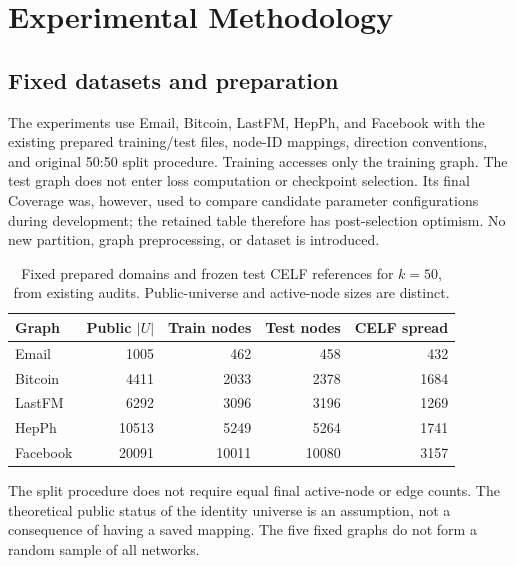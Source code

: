 \chapter{Experimental Methodology}\label{ch:design}
\section{Fixed datasets and preparation}
The experiments use Email, Bitcoin, LastFM, HepPh, and Facebook with the existing prepared training/test files, node-ID mappings, direction conventions, and original 50:50 split procedure. Training accesses only the training graph. The test graph does not enter loss computation or checkpoint selection. Its final Coverage was, however, used to compare candidate parameter configurations during development; the retained table therefore has post-selection optimism. No new partition, graph preprocessing, or dataset is introduced.

\begin{table}[htbp]
\centering\small
\caption{Fixed prepared domains and frozen test CELF references for $k=50$, from existing audits. Public-universe and active-node sizes are distinct.}\label{tab:datasets}
\begin{tabular}{lrrrr}\toprule
Graph & Public $|U|$ & Train nodes & Test nodes & CELF spread\\\midrule
Email & 1005 & 462 & 458 & 432\\
Bitcoin & 4411 & 2033 & 2378 & 1684\\
LastFM & 6292 & 3096 & 3196 & 1269\\
HepPh & 10513 & 5249 & 5264 & 1741\\
Facebook & 20091 & 10011 & 10080 & 3157\\\bottomrule
\end{tabular}
\end{table}

The split procedure does not require equal final active-node or edge counts. The theoretical public status of the identity universe is an assumption, not a consequence of having a saved mapping. The five fixed graphs do not form a random sample of all networks.

